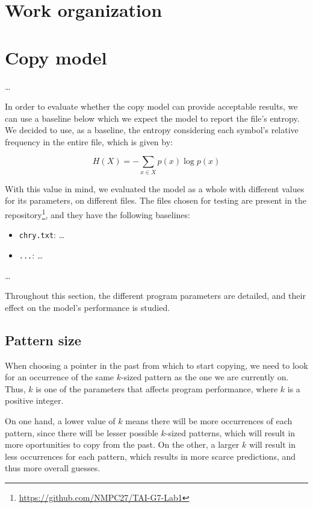 \documentclass{article}
\begin{document}
\section{Work organization}
\label{sec:work-organization}

\section{Copy model}
\label{sec:copy-model}

\dots

In order to evaluate whether the copy model can provide acceptable results, we can use a baseline below which we expect the model to report the file's entropy.
We decided to use, as a baseline, the entropy considering each symbol's relative frequency in the entire file, which is given by:

$$
H(X) = - \sum_{x \in X}{p(x) \log{p(x)}}
$$

With this value in mind, we evaluated the model as a whole with different values for its parameters, on different files.
The files chosen for testing are present in the repository\footnote{\url{https://github.com/NMPC27/TAI-G7-Lab1}}, and they have the following baselines:
\begin{itemize}
    \item \verb|chry.txt|: \dots
    \item \verb|...|: \dots
\end{itemize}

\dots

Throughout this section, the different program parameters are detailed, and their effect on the model's performance is studied.

\subsection{Pattern size}

When choosing a pointer in the past from which to start copying, we need to look for an occurrence of the same $k$-sized pattern as the one we are currently on.
Thus, $k$ is one of the parameters that affects program performance, where $k$ is a positive integer.

On one hand, a lower value of $k$ means there will be more occurrences of each pattern, since there will be lesser possible $k$-sized patterns, which will result in more oportunities to copy from the past.
On the other, a larger $k$ will result in less occurrences for each pattern, which results in more scarce predictions, and thus more overall guesses.
\end{document}
